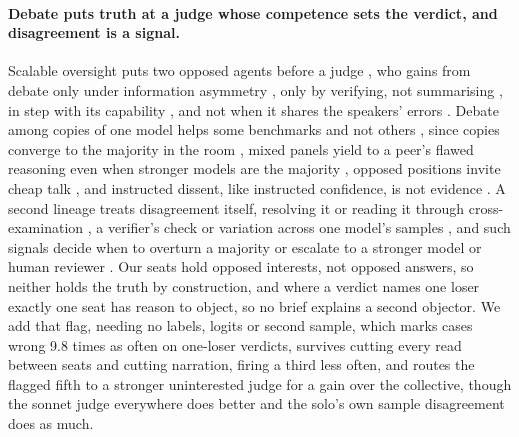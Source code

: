 \paragraph{Debate puts truth at a judge whose competence sets the verdict, and disagreement is a signal.}
Scalable oversight puts two opposed agents before a judge \citep{irving18},
who gains from debate
\citep{michael2023debate,khan2024debating,rahman2025controversial,arnesen2024selfplay,lang2025debate}
only under information asymmetry \citep{kenton2024scalable}, only by
verifying, not summarising \citep{elasky2026weak}, in step with its capability
\citep{engels2025scaling}, and not when it shares the speakers' errors
\citep{goel2025alike}. Debate among copies of one model helps some benchmarks
\citep{du23,liang2024divergent,chan2023chateval} and not others
\citep{smit2024mad,wang2024rethinking,zhang2025overvaluing}, since copies
converge to the majority in the room
\citep{estornell2024multillm,zhu2026demystifying,choi2025debateorvote}, mixed
panels yield to a peer's flawed reasoning even when stronger models are the
majority \citep{wynn2025talk}, opposed positions invite cheap talk
\citep{chen2026fail}, and instructed dissent, like instructed confidence, is
not evidence \citep{qian2026layered,prasad2025win}. A second lineage treats
disagreement itself, resolving it \citep{jiang2026disagreement} or reading it
through cross-examination \citep{cohen2023lmvslm}, a verifier's check
\citep{kirchner2024prover,browncohen2024doubly,browncohen2025prover,hammond2025neural}
or variation across one model's samples
\citep{wang2023selfconsistency,manakul2023selfcheck,farquhar2024semantic,xiong2024confidence},
and such signals decide when to overturn a majority
\citep{he2026minoritysentinel} or escalate to a stronger model or human
reviewer
\citep{chen2023frugal,aggarwal2024automix,gupta2024cascades,yue2024cascades,jung2025escalate,wang2026defer,jitkrittum2023deferral}.
Our seats hold opposed interests, not opposed answers, so neither holds the
truth by construction, and where a verdict names one loser exactly one seat
has reason to object, so no brief explains a second objector. We add that
flag, needing no labels, logits or second sample, which marks cases wrong 9.8
times as often on one-loser verdicts, survives cutting every read between
seats and cutting narration, firing a third less often, and routes the flagged
fifth to a stronger uninterested judge for a gain over the collective, though
the sonnet judge everywhere does better and the solo's own sample disagreement
does as much.

